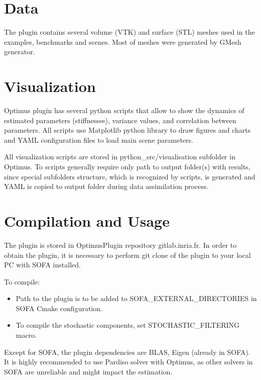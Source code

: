 \documentclass[10pt]{article}
\begin{document}
\section{Data}

The plugin contains several volume (VTK) and surface (STL) meshes used in the examples, benchmarks and scenes. Most of meshes were generated by GMesh generator.



\section{Visualization}

Optimus plugin has several python scripts that allow to show the dynamics of estimated parameters (stiffnesses), variance values, and correlation between parameters. All scripts use Matplotlib python library to draw figures and charts and YAML configuration files to load main scene parameters.

All visualization scripts are stored in python\_src/visualisation subfolder in Optimus. To scripts generally require only path to output folder(s) with results, since special subfolders structure, which is recognized by scripts, is generated and YAML is copied to output folder during data assimilation process.



\section{Compilation and Usage}
The plugin is stored in OptimusPlugin repository gitlab.inria.fr. In order to obtain the plugin, it is necessary to perform git clone of the plugin to your local PC with SOFA installed.

To compile:
\begin{itemize}
\item Path to the plugin is to be added to SOFA\_EXTERNAL\_DIRECTORIES in SOFA Cmake configuration.
\item To compile the stochastic components, set STOCHASTIC\_FILTERING macro.
\end{itemize}

Except for SOFA, the plugin dependencies are BLAS, Eigen (already in SOFA). It is highly recommended to use Pardiso solver with Optimus, as other solvers in SOFA are unreliable and might impact the estimation.

\end{document}
